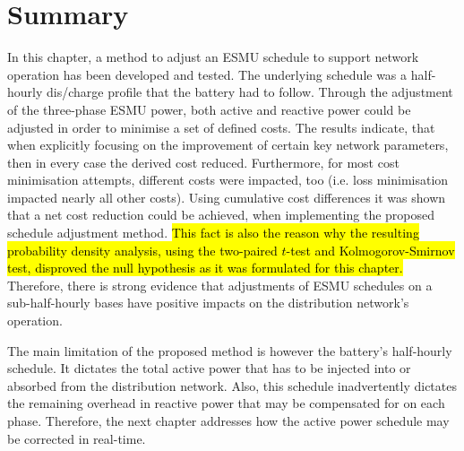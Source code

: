 \section{Summary}
\label{ch1:sec:summary}

In this chapter, a method to adjust an ESMU schedule to support network operation has been developed and tested.
The underlying schedule was a half-hourly dis/charge profile that the battery had to follow.
Through the adjustment of the three-phase ESMU power, both active and reactive power could be adjusted in order to minimise a set of defined costs.
The results indicate, that when explicitly focusing on the improvement of certain key network parameters, then in every case the derived cost reduced.
Furthermore, for most cost minimisation attempts, different costs were impacted, too (i.e. loss minimisation impacted nearly all other costs).
Using cumulative cost differences it was shown that a net cost reduction could be achieved, when implementing the proposed schedule adjustment method.
\textcolor{red}{\hl{This fact is also the reason why the resulting probability density analysis, using the two-paired $t$-test and Kolmogorov-Smirnov test, disproved the null hypothesis as it was formulated for this chapter.}}
Therefore, there is strong evidence that adjustments of ESMU schedules on a sub-half-hourly bases have positive impacts on the distribution network's operation.

The main limitation of the proposed method is however the battery's half-hourly schedule.
It dictates the total active power that has to be injected into or absorbed from the distribution network.
Also, this schedule inadvertently dictates the remaining overhead in reactive power that may be compensated for on each phase.
Therefore, the next chapter addresses how the active power schedule may be corrected in real-time.